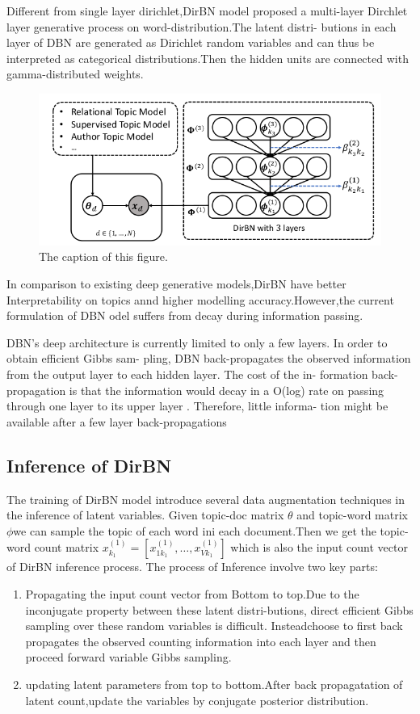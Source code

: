 Different from single layer dirichlet,DirBN model proposed a multi-layer Dirchlet layer generative process on word-distribution.The latent distri-
butions in each layer of DBN are generated as Dirichlet
random variables and can thus be interpreted as categorical
distributions.Then  the hidden units are connected with gamma-distributed weights.

\begin{figure}[htbp]
\includegraphics[width = 13cm]{dirbn.png}
\caption{The caption of this figure.}
\label{fig:figure1label}
\end{figure}

In comparison to existing deep generative models,DirBN have better Interpretability on topics annd higher modelling accuracy.However,the current formulation of DBN odel suffers from decay during information passing.

DBN’s deep architecture is currently limited to
only a few layers. In order to obtain efficient Gibbs sam-
pling, DBN back-propagates the observed information from
the output layer to each hidden layer. The cost of the in-
formation back-propagation is that the information would
decay in a O(log) rate on passing through one layer to its
upper layer \cite{Zhou}. Therefore, little informa-
tion might be available after a few layer back-propagations
\subsection{Inference of DirBN}
The training of DirBN model introduce several data augmentation techniques in the inference of latent variables.
Given topic-doc matrix $\theta$ and topic-word matrix $\phi$we can sample the topic of each word ini each document.Then we get the topic-word count matrix $x_{k_1}^{(1)} = [x_{1k_1}^{(1)},\dots,x_{Vk_1}^{(1)}]$ which is also the input count vector of DirBN inference process.
The process of Inference involve two key parts:
\begin{enumerate}
  \item Propagating the input count vector from
Bottom to top.Due to the inconjugate property between these latent distri-butions, direct efficient Gibbs sampling over these random variables is difficult. Insteadchoose to first back propagates the observed counting information into each layer and then proceed forward variable Gibbs sampling.
\item updating latent parameters from top to bottom.After back propagatation of latent count,update the variables by conjugate posterior distribution.

\end{enumerate}
